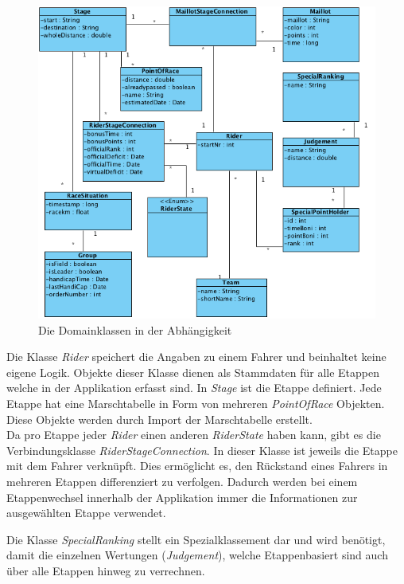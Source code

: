 \begin{figure}[h!]
\caption{Die Domainklassen in der Abhängigkeit}
\label{fig:domain}
\centering
\includegraphics[scale=0.9]{05bericht/images/domain.png}
\end{figure} 


Die Klasse \textit{Rider} speichert die Angaben zu einem Fahrer und beinhaltet keine eigene Logik. Objekte dieser Klasse dienen als Stammdaten für alle Etappen welche in der Applikation erfasst sind.
In \textit{Stage} ist die Etappe definiert. Jede Etappe hat eine Marschtabelle in Form von mehreren \textit{PointOfRace} Objekten. Diese Objekte werden durch Import der Marschtabelle erstellt.
\\

Da pro Etappe jeder \textit{Rider} einen anderen \textit{RiderState} haben kann, gibt es die Verbindungsklasse \textit{RiderStageConnection}. In dieser Klasse ist jeweils die Etappe mit dem Fahrer verknüpft. Dies ermöglicht es, den Rückstand eines Fahrers in mehreren Etappen differenziert zu verfolgen. Dadurch werden bei einem Etappenwechsel innerhalb der Applikation immer die Informationen zur ausgewählten Etappe verwendet.

Die Klasse \textit{SpecialRanking} stellt ein Spezialklassement dar und wird benötigt, damit die einzelnen Wertungen (\textit{Judgement}), welche Etappenbasiert sind auch über alle Etappen hinweg zu verrechnen.

